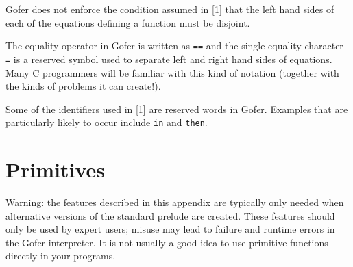 \IT  Gofer does not enforce the condition assumed in [1] that the  left
     hand sides of each of the equations defining a  function  must  be
     disjoint.

\IT  The equality operator in Gofer is written as  \verb"=="  and the single
     equality character \verb"=" is a reserved symbol used to separate  left
     and right hand sides of equations.  Many  C  programmers  will  be
     familiar with this kind of notation (together with  the  kinds  of
     problems it can create!).

\IT  Some of the  identifiers used in  [1] are reserved words in Gofer.
     Examples that are particularly likely to occur  include  \verb"in"  and
     \verb"then".
\EI

\chapter{Primitives}

Warning: the features described in this appendix  are  typically  only
needed when alternative versions of the standard prelude  are  created.
These features should only be used by expert users; misuse may lead  to
failure and runtime errors in the Gofer interpreter.  It is not usually
a good idea to use primitive functions directly in your programs.

